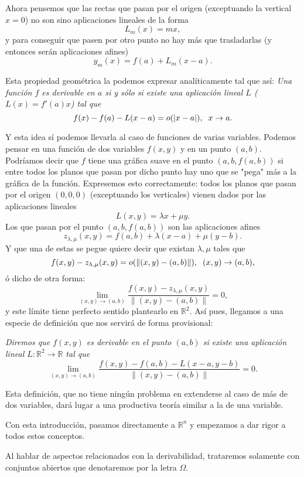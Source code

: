 \documentclass[12pt]{article}
\providecommand{\abs}[1]{\lvert#1\rvert}
\providecommand{\norm}[1]{\lVert#1\rVert}
\begin{document}
Ahora pensemos que las rectas que pasan por el origen (exceptuando la vertical $x=0$) no son sino aplicaciones lineales de la forma $$L_m(x) = mx,$$ y para conseguir que pasen por otro punto no hay más que trasladarlas (y entonces serán aplicaciones afines) $$y_m(x)= f(a) + L_m(x-a).$$

Esta propiedad geométrica la podemos expresar analíticamente tal que así: \textit{Una función $f$ es derivable en $a$ si y sólo si existe una aplicación lineal $L$ ($L(x)=f'(a)x$) tal que} $$f(x)-f(a)-L(x-a)=o(\abs{x-a}), \hspace{0.2cm} x\rightarrow a.$$

Y esta idea sí podemos llevarla al caso de funciones de varias variables. Podemos pensar en una función de dos variables $f(x,y)$ y en un punto $(a,b)$. Podríamos decir que $f$ tiene una gráfica suave en el punto $(a,b,f(a,b))$ si entre todos los planos que pasan por dicho punto hay uno que se "pega" más a la gráfica de la función. Expresemos esto correctamente: todos los planos que pasan por el origen $(0,0,0)$ (exceptuando los verticales) vienen dados por las aplicaciones lineales $$L(x,y)= \lambda x + \mu y.$$ Los que pasan por el punto $(a,b,f(a,b))$ son las aplicaciones afines $$z_{\lambda, \mu}(x,y) = f(a,b) + \lambda(x-a) + \mu(y-b).$$ Y que una de estas se pegue quiere decir que existan $\lambda, \mu$ tales que $$f(x,y) - z_{\lambda, \mu}(x,y)=o(\norm{(x,y)-(a,b)}), \hspace{0.2cm} (x,y) \rightarrow (a,b),$$ ó dicho de otra forma:$$\lim_{(x,y) \rightarrow (a,b)}\dfrac{f(x,y)-z_{\lambda,\mu}(x,y)}{\norm{(x,y)-(a,b)}} = 0,$$ y este límite tiene perfecto sentido plantearlo en $\mathbb{R}^2$. Así pues, llegamos a una especie de definición que nos servirá de forma provisional: 

\textit{Diremos que $f(x,y)$ es derivable en el punto $(a,b)$ si existe una aplicación lineal $L \colon \mathbb{R}^2 \longrightarrow \mathbb{R}$ tal que } $$\lim_{(x,y)\rightarrow(a,b)}\dfrac{f(x,y)-f(a,b)-L(x-a,y-b)}{\norm{(x,y)-(a,b)}}=0.$$

Esta definición, que no tiene ningún problema en extenderse al caso de más de dos variables, dará lugar a una productiva teoría similar a la de una variable.

Con esta introducción, pasamos directamente a $\mathbb{R}^n$ y empezamos a dar rigor a todos estos conceptos. 

Al hablar de aspectos relacionados con la derivabilidad, trataremos solamente con conjuntos abiertos que denotaremos por la letra $\Omega$.
\end{document}
